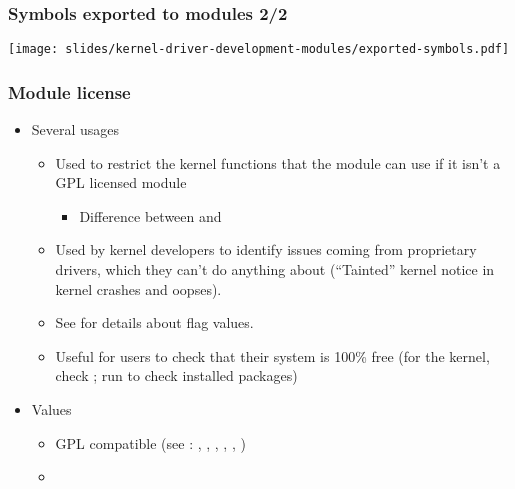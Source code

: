 \begin{frame}
  \frametitle{Symbols exported to modules 2/2}
  \begin{center}
    \texttt{[image: slides/kernel-driver-development-modules/exported-symbols.pdf]}
  \end{center}
\end{frame}

\begin{frame}
  \frametitle{Module license}
  \begin{itemize}
  \item Several usages
    \begin{itemize}
    \item Used to restrict the kernel functions that the module can
      use if it isn't a GPL licensed module
      \begin{itemize}
      \item Difference between  and
      \end{itemize}
    \item Used by kernel developers to identify issues coming from
      proprietary drivers, which they can't do anything about
      (“Tainted” kernel notice in kernel crashes and oopses).
    \item See 
      for details about  flag values.
    \item Useful for users to check that their system is 100\% free
      (for the kernel, check ; run
       to check installed packages)
    \end{itemize}
  \item Values
    \begin{itemize}
    \item GPL compatible (see :
      , , ,
      , , )
    \item {}
    \end{itemize}
  \end{itemize}
\end{frame}

